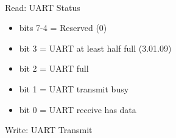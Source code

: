 \\
Read: UART Status\\
\begin{itemize}
\item[] bits 7-4 = Reserved (0)
\item[] bit 3 = UART at least half full (3.01.09)
\item[] bit 2 = UART full
\item[] bit 1 = UART transmit busy
\item[] bit 0 = UART receive has data
\end{itemize}
Write: UART Transmit

